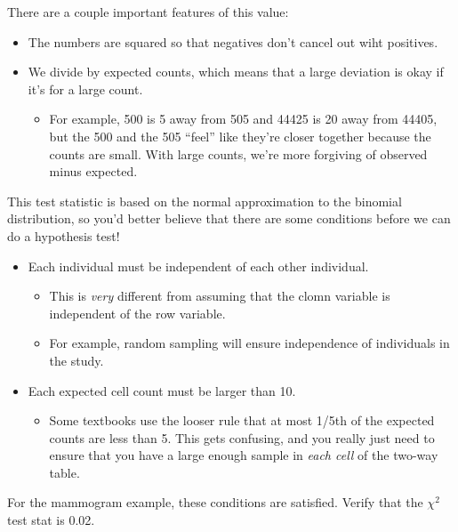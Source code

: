 \documentclass[
  letterpaper,
  DIV=11,
  numbers=noendperiod,
  oneside]{scrreprt}
\providecommand{\tightlist}{%
  \setlength{\itemsep}{0pt}\setlength{\parskip}{0pt}}\usepackage{longtable,booktabs,array}
\begin{document}
There are a couple important features of this value:

\begin{itemize}
\tightlist
\item
  The numbers are squared so that negatives don't cancel out wiht
  positives.
\item
  We divide by expected counts, which means that a large deviation is
  okay if it's for a large count.

  \begin{itemize}
  \tightlist
  \item
    For example, 500 is 5 away from 505 and 44425 is 20 away from 44405,
    but the 500 and the 505 ``feel'' like they're closer together
    because the counts are small. With large counts, we're more
    forgiving of observed minus expected.
  \end{itemize}
\end{itemize}

This test statistic is based on the normal approximation to the binomial
distribution, so you'd better believe that there are some conditions
before we can do a hypothesis test!

\begin{itemize}
\tightlist
\item
  Each individual must be independent of each other individual.

  \begin{itemize}
  \tightlist
  \item
    This is \emph{very} different from assuming that the clomn variable
    is independent of the row variable.
  \item
    For example, random sampling will ensure independence of individuals
    in the study.
  \end{itemize}
\item
  Each expected cell count must be larger than 10.

  \begin{itemize}
  \tightlist
  \item
    Some textbooks use the looser rule that at most 1/5th of the
    expected counts are less than 5. This gets confusing, and you really
    just need to ensure that you have a large enough sample in
    \emph{each cell} of the two-way table.
  \end{itemize}
\end{itemize}

For the mammogram example, these conditions are satisfied. Verify that
the \(\chi^2\) test stat is 0.02.
\end{document}
